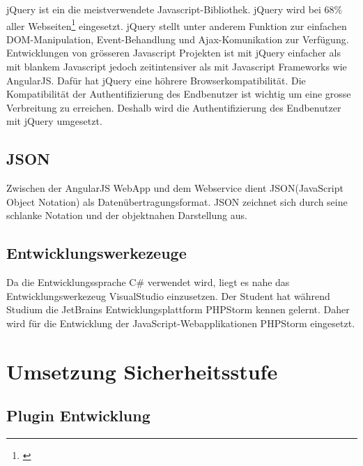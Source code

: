 jQuery ist ein die meistverwendete Javascript-Bibliothek. jQuery wird
bei 68\% aller Webseiten\footnote{\autocite{w3techweb2015}} eingesetzt.
jQuery stellt unter anderem Funktion zur einfachen DOM-Manipulation,
Event-Behandlung und Ajax-Komunikation zur Verfügung. Entwicklungen von
grösseren Javascript Projekten ist mit jQuery einfacher als mit blankem
Javascript jedoch zeitintensiver als mit Javascript Frameworks wie
AngularJS. Dafür hat jQuery eine höhrere Browserkompatibilität. Die
Kompatibilität der Authentifizierung des Endbenutzer ist wichtig um eine
grosse Verbreitung zu erreichen. Deshalb wird die Authentifizierung des
Endbenutzer mit jQuery umgesetzt.

\subsection{JSON}\label{json}

Zwischen der AngularJS WebApp und dem Webservice dient JSON(JavaScript
Object Notation) als Datenübertragungsformat. JSON zeichnet sich durch
seine schlanke Notation und der objektnahen Darstellung aus.

\hypertarget{entwicklungswerkezeuge}{\subsection{Entwicklungswerkezeuge}\label{entwicklungswerkezeuge}}

Da die Entwicklungssprache C\# verwendet wird, liegt es nahe das
Entwicklungswerkezeug VisualStudio einzusetzen. Der Student hat während
Studium die JetBrains Entwicklungsplattform PHPStorm kennen gelernt.
Daher wird für die Entwicklung der JavaScript-Webapplikationen PHPStorm
eingesetzt.

\newpage

\section{Umsetzung Sicherheitsstufe}\label{umsetzung-sicherheitsstufe}

\subsection{Plugin Entwicklung}\label{plugin-entwicklung}


